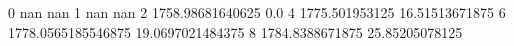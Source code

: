 0 nan nan
1 nan nan
2 1758.98681640625 0.0
4 1775.501953125 16.51513671875
6 1778.0565185546875 19.0697021484375
8 1784.8388671875 25.85205078125
